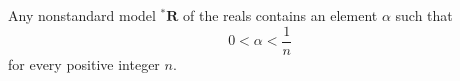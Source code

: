 Any nonstandard model ${^*\mathbf{R}}$ of the reals contains an element $\alpha$ such that
$$0 < \alpha < \frac{1}{n}$$
for every positive integer $n$.
